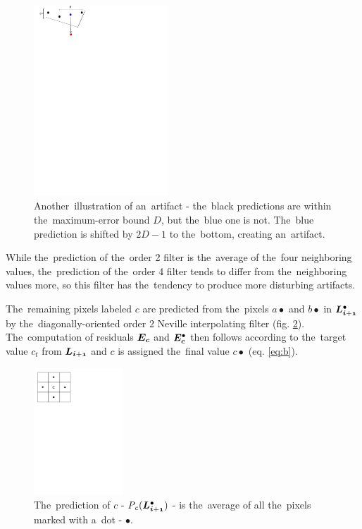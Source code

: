 \begin{figure}
	\includegraphics[trim={0 24cm 7cm 0}, clip, width=0.45\textwidth]{figures/artifs_theory2.pdf}\centering
	\caption{Another~illustration of an~artifact - the~black predictions are within the~maximum-error bound $D$, but the~blue one is not. The~blue prediction is shifted by $2D - 1$ to the~bottom, creating an~artifact.}
	\label{fig:artifs_theory}
\end{figure}

While the~prediction of the~order 2 filter is the~average of the~four neighboring values, the~prediction of the~order 4 filter tends to differ from the~neighboring values more, so this filter has the~tendency to produce more disturbing artifacts.

The~remaining pixels labeled $c$ are predicted from the~pixels $a\bullet$ and $b\bullet$ in $\ldot{i+1}$ by the~diagonally-oriented order 2 Neville interpolating filter (fig. \ref{fig:ccomp}). The~computation of residuals $\objnorm{E}{c}$ and $\objdot{E}{c}$ then follows according to the~target value $c_t$ from $\lnorm{i+1}$ and $c$ is assigned the~final value $c\bullet$ (eq. \ref{eq:b}).

\begin{figure}
	\includegraphics[trim={0 21cm 10cm 0}, clip, width=0.3\textwidth]{figures/ccomp.pdf}\centering
	\caption{The~prediction of $c$ - $\opnorm{P}{c}(\ldot{i+1})$ - is the~average of all the~pixels marked with a~dot - $\bullet$.}
	\label{fig:ccomp}
\end{figure}

